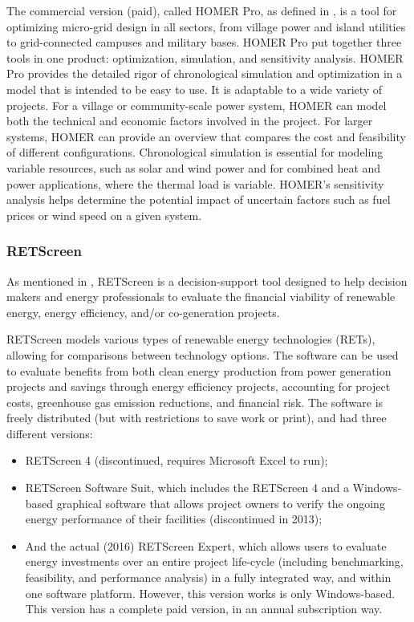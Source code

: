 The commercial version (paid), called HOMER Pro, as defined in \cite{Swarnkar}, is a tool for optimizing micro-grid design in all sectors, from village power and island utilities to grid-connected campuses and military bases. HOMER Pro put together three tools in one product: optimization, simulation, and sensitivity analysis. HOMER Pro provides the detailed rigor of chronological simulation and optimization in a model that is intended to be easy to use. It is adaptable to a wide variety of projects. For a village or community-scale power system, HOMER can model both the technical and economic factors involved in the project. For larger systems, HOMER can provide an overview that compares the cost and feasibility of different configurations. Chronological simulation is essential for modeling variable resources, such as solar and wind power and for combined heat and power applications, where the thermal load is variable. HOMER's sensitivity analysis helps determine the potential impact of uncertain factors such as fuel prices or wind speed on a given system. 

\subsubsection{RETScreen}
As mentioned in \cite{Pradhan}, RETScreen is a decision-support tool designed to help decision makers and energy professionals to evaluate the financial viability of renewable energy, energy efficiency, and/or co-generation projects.

RETScreen models various types of renewable energy technologies (RETs), allowing for comparisons between technology options. The software can be used to evaluate benefits from both clean energy production from power generation projects and savings through energy efficiency projects, accounting for project costs, greenhouse gas emission reductions, and financial risk. The software is freely distributed (but with restrictions to save work or print), and had three different versions:

\begin{itemize}
\item RETScreen 4 (discontinued, requires Microsoft Excel to run); 
\item RETScreen Software Suit, which includes the RETScreen 4 and a Windows-based graphical software that allows project owners to verify the ongoing energy performance of their facilities (discontinued in 2013);
\item And the actual (2016) RETScreen Expert, which allows users to evaluate energy investments over an entire project life-cycle (including benchmarking, feasibility, and performance analysis) in a fully integrated way, and within one software platform. However, this version works is only Windows-based. This version has a complete paid version, in an annual subscription way.
\end{itemize}

